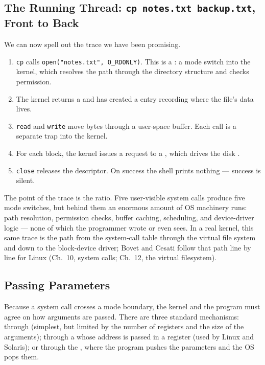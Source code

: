 \documentclass[11pt]{article}
\begin{document}
\subsection{The Running Thread: \texttt{cp notes.txt backup.txt}, Front to Back}

We can now spell out the trace we have been promising.

\begin{enumerate}
  \item \texttt{cp} calls \texttt{open("notes.txt", O\_RDONLY)}. This is a : a mode switch into the kernel, which resolves the path through the directory structure and checks permission.
  \item The kernel returns a  and has created a  entry recording where the file's data lives.
  \item \texttt{read} and \texttt{write} move bytes through a user-space buffer. Each call is a separate trap into the kernel.
  \item For each block, the kernel issues a request to a , which drives the disk .
  \item \texttt{close} releases the descriptor. On success the shell prints nothing --- success is silent.
\end{enumerate}

The point of the trace is the ratio. Five user-visible system calls produce five mode switches, but behind them an enormous amount of OS machinery runs: path resolution, permission checks, buffer caching, scheduling, and device-driver logic --- none of which the programmer wrote or even sees. In a real kernel, this same trace is the path from the system-call table through the virtual file system and down to the block-device driver; Bovet and Cesati follow that path line by line for Linux (Ch.~10, system calls; Ch.~12, the virtual filesystem).

\subsection{Passing Parameters}

Because a system call crosses a mode boundary, the kernel and the program must agree on how arguments are passed. There are three standard mechanisms: through  (simplest, but limited by the number of registers and the size of the arguments); through a  whose address is passed in a register (used by Linux and Solaris); or through the , where the program pushes the parameters and the OS pops them.
\end{document}
